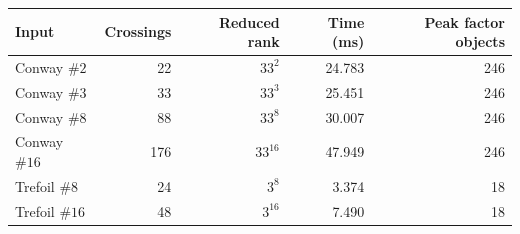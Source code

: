 \begin{tabular}{lrrrr}
\toprule
Input & Crossings & Reduced rank & Time (ms) & Peak factor objects \\
\midrule
Conway $\#2$ & 22 & $33^{2}$ & 24.783 & 246 \\
Conway $\#3$ & 33 & $33^{3}$ & 25.451 & 246 \\
Conway $\#8$ & 88 & $33^{8}$ & 30.007 & 246 \\
Conway $\#16$ & 176 & $33^{16}$ & 47.949 & 246 \\
Trefoil $\#8$ & 24 & $3^{8}$ & 3.374 & 18 \\
Trefoil $\#16$ & 48 & $3^{16}$ & 7.490 & 18 \\
\bottomrule
\end{tabular}
